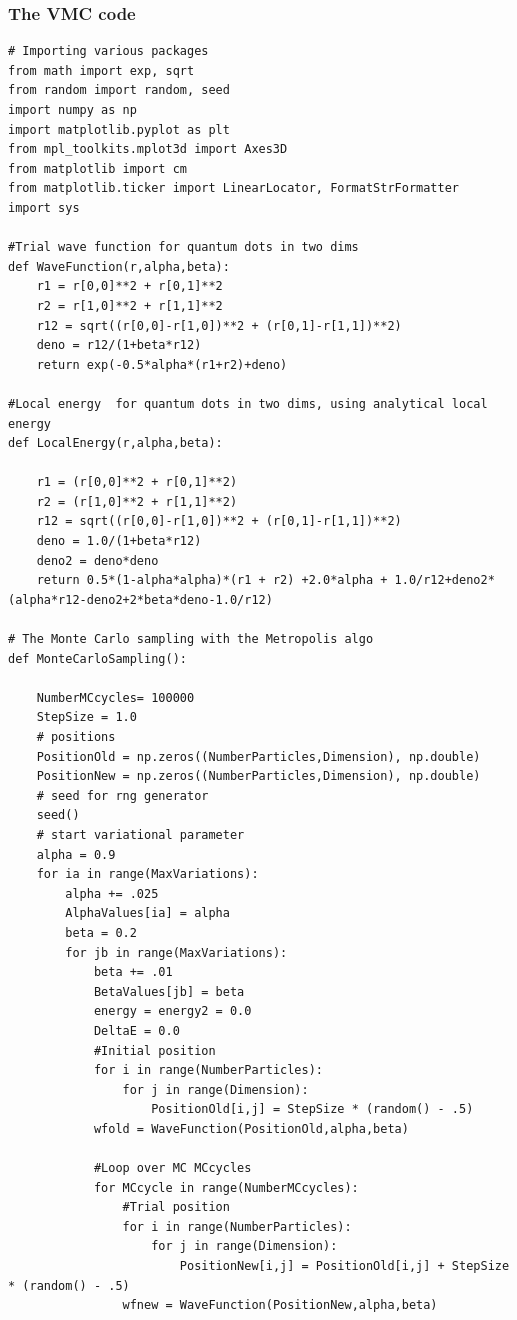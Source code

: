 \documentclass{beamer}
\begin{document}
\begin{frame}
\frametitle{The VMC code}

\begin{verbatim}
# Importing various packages
from math import exp, sqrt
from random import random, seed
import numpy as np
import matplotlib.pyplot as plt
from mpl_toolkits.mplot3d import Axes3D
from matplotlib import cm
from matplotlib.ticker import LinearLocator, FormatStrFormatter
import sys

#Trial wave function for quantum dots in two dims
def WaveFunction(r,alpha,beta):
    r1 = r[0,0]**2 + r[0,1]**2
    r2 = r[1,0]**2 + r[1,1]**2
    r12 = sqrt((r[0,0]-r[1,0])**2 + (r[0,1]-r[1,1])**2)
    deno = r12/(1+beta*r12)
    return exp(-0.5*alpha*(r1+r2)+deno)

#Local energy  for quantum dots in two dims, using analytical local energy
def LocalEnergy(r,alpha,beta):
    
    r1 = (r[0,0]**2 + r[0,1]**2)
    r2 = (r[1,0]**2 + r[1,1]**2)
    r12 = sqrt((r[0,0]-r[1,0])**2 + (r[0,1]-r[1,1])**2)
    deno = 1.0/(1+beta*r12)
    deno2 = deno*deno
    return 0.5*(1-alpha*alpha)*(r1 + r2) +2.0*alpha + 1.0/r12+deno2*(alpha*r12-deno2+2*beta*deno-1.0/r12)

# The Monte Carlo sampling with the Metropolis algo
def MonteCarloSampling():

    NumberMCcycles= 100000
    StepSize = 1.0
    # positions
    PositionOld = np.zeros((NumberParticles,Dimension), np.double)
    PositionNew = np.zeros((NumberParticles,Dimension), np.double)
    # seed for rng generator
    seed()
    # start variational parameter
    alpha = 0.9
    for ia in range(MaxVariations):
        alpha += .025
        AlphaValues[ia] = alpha
        beta = 0.2 
        for jb in range(MaxVariations):
            beta += .01
            BetaValues[jb] = beta
            energy = energy2 = 0.0
            DeltaE = 0.0
            #Initial position
            for i in range(NumberParticles):
                for j in range(Dimension):
                    PositionOld[i,j] = StepSize * (random() - .5)
            wfold = WaveFunction(PositionOld,alpha,beta)

            #Loop over MC MCcycles
            for MCcycle in range(NumberMCcycles):
                #Trial position
                for i in range(NumberParticles):
                    for j in range(Dimension):
                        PositionNew[i,j] = PositionOld[i,j] + StepSize * (random() - .5)
                wfnew = WaveFunction(PositionNew,alpha,beta)


\end{verbatim}
\end{frame}
\end{document}
